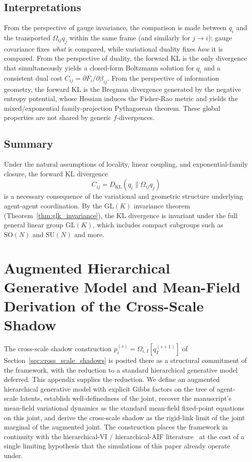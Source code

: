 \documentclass[11pt]{article}
\begin{document}
\subsection*{Interpretations}
From the perspective of gauge invariance, the comparison is made between $q_i$ and the transported $\Omega_{ij}q_j$ within the same frame (and similarly for $j \rightarrow i$); gauge covariance fixes \emph{what} is compared, while variational duality fixes \emph{how} it is compared. From the perspective of duality, the forward KL is the only divergence that simultaneously yields a closed-form Boltzmann solution for $q_i$ and a consistent dual cost $C_{ij} = \partial F_i/\partial\beta_{ij}$. From the perspective of information geometry, the forward KL is the Bregman divergence generated by the negative entropy potential, whose Hessian induces the Fisher-Rao metric and yields the mixed/exponential family-projection Pythagorean theorem. These global properties are not shared by generic $f$-divergences.

\subsection*{Summary}
Under the natural assumptions of locality, linear coupling, and exponential-family closure, the forward KL divergence
\[
\boxed{
C_{ij}=D_{\mathrm{KL}}(q_i \| \Omega_{ij} q_j)}
\]
is a necessary consequence of the variational and geometric structure underlying agent-agent coordination. By the $\mathrm{GL}(K)$ invariance theorem (Theorem~\ref{thm:glk_invariance}), the KL divergence is invariant under the full general linear group $\mathrm{GL}(K)$, which includes compact subgroups such as $\mathrm{SO}(N)$ and $\mathrm{SU}(N)$ and more.

\section{Augmented Hierarchical Generative Model and Mean-Field Derivation of the Cross-Scale Shadow}
\label{app:augmented_joint}

The cross-scale shadow construction $p_i^{(s)} = \Omega_{i,I}[q_I^{(s+1)}]$ of Section~\ref{sec:cross_scale_shadows} is posited there as a structural commitment of the framework, with the reduction to a standard hierarchical generative model deferred. This appendix supplies the reduction. We define an augmented hierarchical generative model with explicit Gibbs factors on the tree of agent-scale latents, establish well-definedness of the joint, recover the manuscript's mean-field variational dynamics as the standard mean-field fixed-point equations on this joint, and derive the cross-scale shadow as the rigid-link limit of the joint marginal of the augmented joint. The construction places the framework in continuity with the hierarchical-VI / hierarchical-AIF literature~\cite{Friston2017, parr2022active} at the cost of a single limiting hypothesis that the simulations of this paper already operate under.
\end{document}
